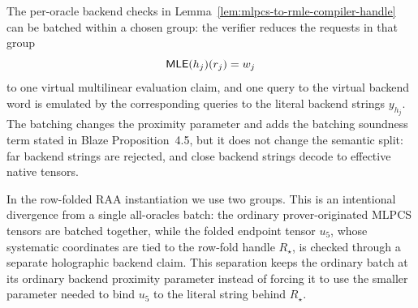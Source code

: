 \begin{proposition}
\label{prop:batched-backend-rmle}
The per-oracle backend checks in Lemma~\ref{lem:mlpcs-to-rmle-compiler-handle}
can be batched within a chosen group: the verifier reduces the requests in that
group
\[
  \mathsf{MLE}(h_j)(r_j)=w_j
\]
to one virtual multilinear evaluation claim, and one query to the virtual
backend word is emulated by the corresponding queries to the literal backend
strings \(y_{h_j}\).  The batching changes the proximity parameter and adds the
batching soundness term stated in Blaze Proposition~4.5, but it does not change
the semantic split: far backend strings are rejected, and close backend strings
decode to effective native tensors.

In the row-folded RAA instantiation we use two groups.  This is an intentional
divergence from a single all-oracles batch: the ordinary prover-originated
MLPCS tensors are batched together, while the folded endpoint tensor \(u_5\),
whose systematic coordinates are tied to the row-fold handle \(R_\star\), is
checked through a separate holographic backend claim.  This separation keeps
the ordinary batch at its ordinary backend proximity parameter instead of
forcing it to use the smaller parameter needed to bind \(u_5\) to the literal
string behind \(R_\star\).
\end{proposition}

